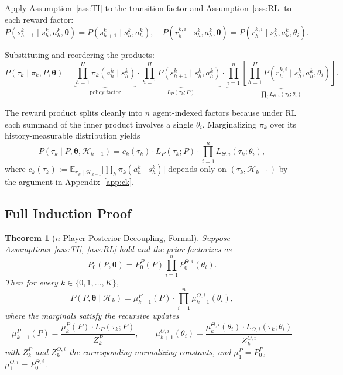 \documentclass{article}
\newtheorem{theorem}{Theorem}[section]
\begin{document}
Apply Assumption~\ref{ass:TI} to the transition factor and Assumption~\ref{ass:RL} to each reward factor:
\begin{equation}
P(s_{h+1}^k \mid s_h^k, a_h^k, \boldsymbol{\theta}) = P(s_{h+1}^k \mid s_h^k, a_h^k), \quad P(r_h^{k,i} \mid s_h^k, a_h^k, \boldsymbol{\theta}) = P(r_h^{k,i} \mid s_h^k, a_h^k, \theta_i).
\end{equation}

Substituting and reordering the products:
\begin{equation}
P(\tau_k \mid \pi_k, P, \boldsymbol{\theta}) = \underbrace{\prod_{h=1}^H \pi_k(a_h^k \mid s_h^k)}_{\text{policy factor}} \cdot \underbrace{\prod_{h=1}^H P(s_{h+1}^k \mid s_h^k, a_h^k)}_{L_P(\tau_k; P)} \cdot \underbrace{\prod_{i=1}^n \left[\prod_{h=1}^H P(r_h^{k,i} \mid s_h^k, a_h^k, \theta_i)\right]}_{\prod_i L_{\Theta,i}(\tau_k; \theta_i)}.
\end{equation}

The reward product splits cleanly into $n$ agent-indexed factors because under RL each summand of the inner product involves a single $\theta_i$. Marginalizing $\pi_k$ over its history-measurable distribution yields
\begin{equation}
\label{eq:n-lik-factor}
P(\tau_k \mid P, \boldsymbol{\theta}, \mathcal{H}_{k-1}) = c_k(\tau_k) \cdot L_P(\tau_k; P) \cdot \prod_{i=1}^n L_{\Theta,i}(\tau_k; \theta_i),
\end{equation}
where $c_k(\tau_k) := \mathbb{E}_{\pi_k \mid \mathcal{H}_{k-1}}\big[\prod_h \pi_k(a_h^k \mid s_h^k)\big]$ depends only on $(\tau_k, \mathcal{H}_{k-1})$ by the argument in Appendix~\ref{app:ck}.

\subsection{Full Induction Proof}

\begin{theorem}[$n$-Player Posterior Decoupling, Formal]
\label{thm:n-player}
Suppose Assumptions~\ref{ass:TI}, \ref{ass:RL} hold and the prior factorizes as
\begin{equation}
P_0(P, \boldsymbol{\theta}) = P_0^P(P) \prod_{i=1}^n P_0^{\Theta,i}(\theta_i).
\end{equation}
Then for every $k \in \{0, 1, \ldots, K\}$,
\begin{equation}
P(P, \boldsymbol{\theta} \mid \mathcal{H}_k) = \mu_{k+1}^P(P) \cdot \prod_{i=1}^n \mu_{k+1}^{\Theta,i}(\theta_i),
\end{equation}
where the marginals satisfy the recursive updates
\begin{equation}
\mu_{k+1}^P(P) = \frac{\mu_k^P(P) \cdot L_P(\tau_k; P)}{Z_k^P}, \qquad \mu_{k+1}^{\Theta,i}(\theta_i) = \frac{\mu_k^{\Theta,i}(\theta_i) \cdot L_{\Theta,i}(\tau_k; \theta_i)}{Z_k^{\Theta,i}}
\end{equation}
with $Z_k^P$ and $Z_k^{\Theta,i}$ the corresponding normalizing constants, and $\mu_1^P = P_0^P$, $\mu_1^{\Theta,i} = P_0^{\Theta,i}$.
\end{theorem}
\end{document}
